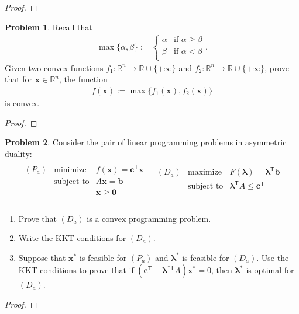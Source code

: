 \documentclass[12pt]{article}
\theoremstyle{definition}
\newtheorem{problem}{Problem}
\newcommand{\vc}[1]{\boldsymbol{#1}}
\newcommand{\tran}{\mathsf{T}}
\begin{document}
\begin{proof}
\end{proof}
\newpage


\begin{problem}
  Recall that
  \begin{align*}
    \max\{\alpha, \beta\} :=
    \begin{cases}
      \alpha & \text{if $\alpha \geq \beta$} \\
      \beta & \text{if $\alpha < \beta$} \\
    \end{cases}.
  \end{align*}
  Given two convex functions $f_1: \mathbb{R}^n \to \mathbb{R} \cup \{+\infty\}$
  and $f_2: \mathbb{R}^n \to \mathbb{R} \cup \{+\infty\}$, prove that for
  $\vc{x} \in \mathbb{R}^n$, the function
  \begin{align*}
    f(\vc{x}) := \max\{f_1(\vc{x}), f_2(\vc{x})\}
  \end{align*}
  is convex.
\end{problem}

\begin{proof}
\end{proof}
\newpage


\begin{problem}
  Consider the pair of linear programming problems in asymmetric duality:
  \begin{align*}
    \begin{array}{ll}
      \begin{array}{rrl}
        (P_a) & \text{minimize} & f(\vc{x}) = \vc{c}^\tran\vc{x} \\
        & \text{subject to} & A\vc{x} = \vc{b} \\
        & & \vc{x} \geq \vc{0} \\
      \end{array}
      &
      \begin{array}{rrl}
        (D_a) & \text{maximize} & F(\vc{\lambda}) = \vc{\lambda}^\tran\vc{b} \\
        & \text{subject to} & \vc{\lambda}^\tran A \leq \vc{c}^\tran \\
        & & \\
      \end{array}
    \end{array}
  \end{align*}
  \begin{enumerate}
    \item Prove that $(D_a)$ is a convex programming problem.
    \item Write the KKT conditions for $(D_a)$.
    \item Suppose that $\vc{x}^*$ is feasible for $(P_a)$ and $\vc{\lambda}^*$ is
      feasible for $(D_a)$. Use the KKT conditions to prove that if $(\vc{c}^\tran - \vc{\lambda}^{*\tran}A)\vc{x}^* = 0$,
      then $\vc{\lambda}^*$ is optimal for $(D_a)$.
  \end{enumerate}
\end{problem}

\begin{proof}
\end{proof}
\end{document}
